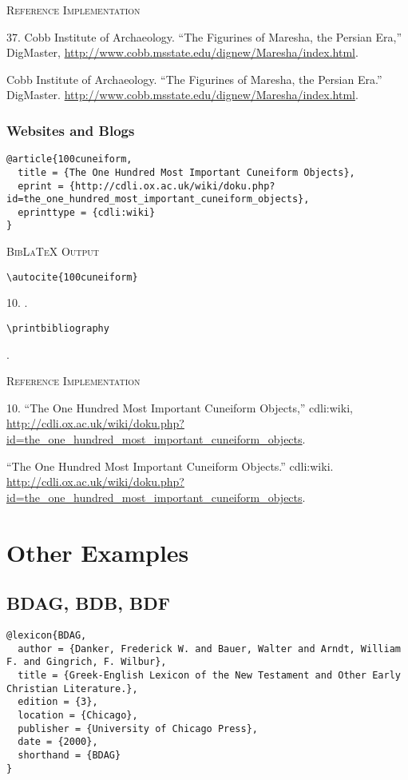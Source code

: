 \documentclass[a4paper]{article}
\newcommand\citetestnsnp[2]{%
  {\textsc{BibLaTeX Output}\par
   \nobreak
   \texttt{\textbackslash autocite\{#2\}}\par
   \color{biblatex-colour}
   #1. \cite{#2}.\par
   \color{black}
   \texttt{\textbackslash printbibliography}\par
   \color{biblatex-colour}
   \hangindent\bibindent\bibentrycite{#2}.\par}}
\newenvironment{refimp}{%
  \begin{minipage}{\linewidth}
    \setlength{\parskip}{1ex}
    \textsc{Reference Implementation}\par
    \nobreak
    \color{reference-colour}
}{\end{minipage}}
\begin{document}
\begin{refimp}
  37. Cobb Institute of Archaeology. “The Figurines of Maresha, the Persian
  Era,” DigMaster,
  \url{http://www.cobb.msstate.edu/dignew/Maresha/index.html}.

  \hangindent\bibindent Cobb Institute of Archaeology. “The Figurines of
  Maresha, the Persian Era.” DigMaster.
  \url{http://www.cobb.msstate.edu/dignew/Maresha/index.html}.
\end{refimp}

\subsubsection{Websites and Blogs}

\begin{lstlisting}
@article{100cuneiform,
  title = {The One Hundred Most Important Cuneiform Objects},
  eprint = {http://cdli.ox.ac.uk/wiki/doku.php?id=the_one_hundred_most_important_cuneiform_objects},
  eprinttype = {cdli:wiki}
}
\end{lstlisting}

\citetestnsnp{10}{100cuneiform}

\begin{refimp}
  \raggedright 

  10. “The One Hundred Most Important Cuneiform Objects,” cdli:wiki,
  \url{http://cdli.ox.ac.uk/wiki/doku.php?id=the_one_hundred_most_important_cuneiform_objects}.

  \hangindent\bibindent “The One Hundred Most Important Cuneiform Objects.”
  cdli:wiki.
  \url{http://cdli.ox.ac.uk/wiki/doku.php?id=the_one_hundred_most_important_cuneiform_objects}.
\end{refimp}

\section{Other Examples}

\subsection{BDAG, BDB, BDF}

\begin{lstlisting}
@lexicon{BDAG,
  author = {Danker, Frederick W. and Bauer, Walter and Arndt, William F. and Gingrich, F. Wilbur},
  title = {Greek-English Lexicon of the New Testament and Other Early Christian Literature.},
  edition = {3},
  location = {Chicago},
  publisher = {University of Chicago Press},
  date = {2000},
  shorthand = {BDAG}
}
\end{lstlisting}
\end{document}
